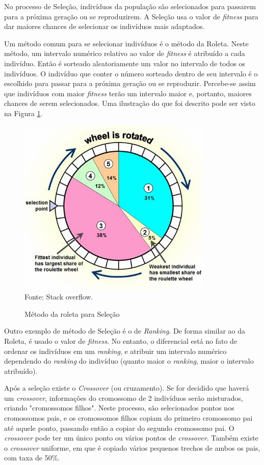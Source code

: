 \documentclass[12pt,a4paper]{article}
\newcommand{\source}[1]{\small Fonte: {#1}}
\begin{document}
	No processo de Seleção,
	indivíduos da população são selecionados para passarem para a próxima geração ou se reproduzirem.
	A Seleção usa o valor de \textit{fitness} para dar maiores chances de selecionar os indivíduos mais adaptados.
	
	Um método comum para se selecionar indivíduos é o método da Roleta.
	Neste método, um intervalo numérico relativo ao valor de \textit{fitness} é atribuído a cada indivíduo.
	Então é sorteado aleatoriamente um valor no intervalo de todos os indivíduos.
	O indivíduo que conter o número sorteado dentro de seu intervalo é o escolhido para passar para a próxima geração ou se reproduzir.
	Percebe-se assim que indivíduos com maior \textit{fitness} terão um intervalo maior e, portanto, maiores chances de serem selecionados.
	Uma ilustração do que foi descrito pode ser visto na Figura \ref{fig:roulette}.
	
	\begin{figure}[ht!]
		\centering
		\caption{Método da roleta para Seleção}
		\includegraphics[scale=0.7]{Roulette.jpg}\\
		\vspace{0.5mm}
		\source{Stack overflow.}
		\label{fig:roulette}
	\end{figure}
	
	Outro exemplo de método de Seleção é o de \textit{Ranking}.
	De forma similar ao da Roleta, é usado o valor de \textit{fitness}.
	No entanto, o diferencial está no fato de ordenar os indivíduos em um \textit{ranking},
	e atribuir um intervalo numérico dependendo do \textit{ranking} do indivíduo
	(quanto maior o \textit{ranking}, maior o intervalo atribuído).
	
	Após a seleção existe o \textit{Crossover} (ou cruzamento).
	Se for decidido que haverá um \textit{crossover},
	informações do cromossomo de 2 indivíduos serão misturados,
	criando "cromossomos filhos"{}.
	Neste processo, são selecionados pontos nos cromossomos pais,
	e os cromossomos filhos copiam do primeiro cromossomo pai até aquele ponto,
	passando então a copiar do segundo cromossomo pai.
	O \textit{crossover} pode ter um único ponto ou vários pontos de \textit{crossover}.
	Também existe o \textit{crossover} uniforme,
	em que é copiado vários pequenos trechos de ambos os pais,
	com taxa de 50\%.
	
\end{document}
